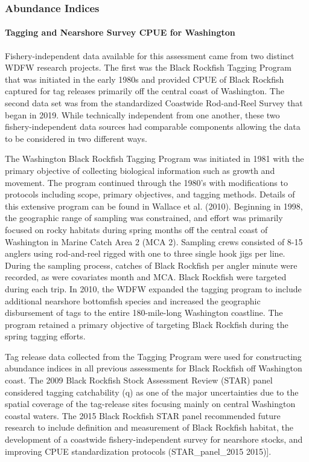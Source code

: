 \documentclass[11pt,
  english,
  letterpaper,
]{article}
\begin{document}
\hypertarget{abundance-indices-1}{%
\subsubsection{Abundance Indices}\label{abundance-indices-1}}

\hypertarget{tagging-and-nearshore-survey-cpue-for-washington}{%
\paragraph{Tagging and Nearshore Survey CPUE for Washington}\label{tagging-and-nearshore-survey-cpue-for-washington}}

Fishery-independent data available for this assessment came from two distinct WDFW research projects. The first was the Black Rockfish Tagging Program that was initiated in the early 1980s and provided CPUE of Black Rockfish captured for tag releases primarily off the central coast of Washington. The second data set was from the standardized Coastwide Rod-and-Reel Survey that began in 2019. While technically independent from one another, these two fishery-independent data sources had comparable components allowing the data to be considered in two different ways.

The Washington Black Rockfish Tagging Program was initiated in 1981 with the primary objective of collecting biological information such as growth and movement. The program continued through the 1980's with modifications to protocols including scope, primary objectives, and tagging methods. Details of this extensive program can be found in Wallace et al. (2010). Beginning in 1998, the geographic range of sampling was constrained, and effort was primarily focused on rocky habitats during spring months off the central coast of Washington in Marine Catch Area 2 (MCA 2). Sampling crews consisted of 8-15 anglers using rod-and-reel rigged with one to three single hook jigs per line. During the sampling process, catches of Black Rockfish per angler minute were recorded, as were covariates month and MCA. Black Rockfish were targeted during each trip. In 2010, the WDFW expanded the tagging program to include additional nearshore bottomfish species and increased the geographic disbursement of tags to the entire 180-mile-long Washington coastline. The program retained a primary objective of targeting Black Rockfish during the spring tagging efforts.

Tag release data collected from the Tagging Program were used for constructing abundance indices in all previous assessments for Black Rockfish off Washington coast. The 2009 Black Rockfish Stock Assessment Review (STAR) panel considered tagging catchability (q) as one of the major uncertainties due to the spatial coverage of the tag-release sites focusing mainly on central Washington coastal waters. The 2015 Black Rockfish STAR panel recommended future research to include definition and measurement of Black Rockfish habitat, the development of a coastwide fishery-independent survey for nearshore stocks, and improving CPUE standardization protocols (STAR\_panel\_2015 2015){]}.
\end{document}
